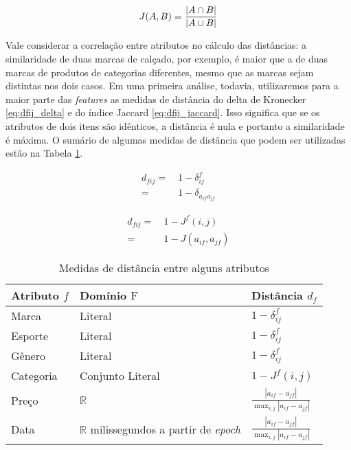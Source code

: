 \begin{equation}
\label{eq:jaccard}
J(A,B) ={{|A \cap B|}\over{|A \cup B|}}
\end{equation}

Vale considerar a correlação entre atributos no cálculo das distâncias: a similaridade de duas marcas de calçado, por exemplo, é maior que a de duas marcas de produtos de categorias diferentes, mesmo que as marcas sejam distintas nos dois casos. Em uma primeira análise, todavia, utilizaremos para a maior parte das \textit{features} as medidas de distância do delta de Kronecker \ref{eq:dfij_delta} e do índice Jaccard \ref{eq:dfij_jaccard}. Isso significa que se os atributos de dois itens são idênticos, a distância é nula e portanto a similaridade é máxima. O sumário de algumas medidas de distância que podem ser utilizadas estão na Tabela \ref{tab:medidas-distancia}.

\begin{equation}
\label{eq:dfij_delta}
\begin{split}
d_{fij} =&~ 1-\delta_{ij}^f \\
    =&~ 1-\delta_{a_{if} a_{jf}}
\end{split} 
\end{equation}

\begin{equation}
\label{eq:dfij_jaccard}
\begin{split}
d_{fij} =&~ 1-J^f(i,j) \\
    =&~ 1-J(a_{if},a_{jf})
\end{split} 
\end{equation}

\begin{table}[hp]
\begin{center}
    \caption{Medidas de distância entre alguns atributos}
    \label{tab:medidas-distancia}
    \begin{tabular}{  | >{\arraybackslash} m{3cm} | >{\arraybackslash} m{3cm} | >{\centering\arraybackslash} m{3cm} | } 
    \hline
    \textbf{Atributo} $f$ & \textbf{Domínio} $\mathrm{F}$ & \textbf{Distância} $d_f$ \\ \hline
    Marca & Literal & $1-\delta^f_{ij}$ \\ \hline    
    Esporte & Literal & $1-\delta^f_{ij}$ \\ \hline
    Gênero & Literal & $1-\delta^f_{ij}$ \\ \hline            
    Categoria & Conjunto Literal & $1-J^f(i,j)$ \\ \hline            
    Preço & $\mathbb{R}$ & $ \frac{\left| a_{if}-a_{jf} \right|}{\max_{i,j}{\left| a_{if}-a_{jf} \right|}} $ \\ \hline
    Data & $\mathbb{R}$ milissegundos a partir de \textit{epoch} \cite{epoch} & $ \frac{\left| a_{if}-a_{jf} \right|}{\max_{i,j}{\left| a_{if}-a_{jf} \right|}} $ \\ \hline
    \end{tabular}
\end{center}
\end{table}
 
